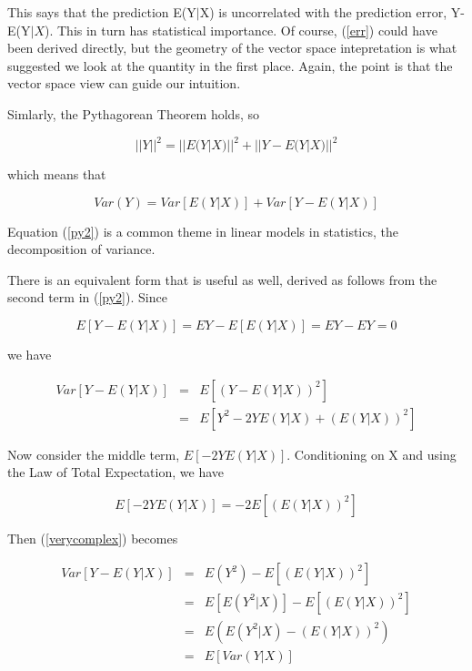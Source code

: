 This says that the prediction E(Y$|$X) is uncorrelated with the
prediction error, Y-E(Y$|X$).  This in turn has statistical importance.
Of course, (\ref{err}) could have been derived directly, but the
geometry of the vector space intepretation is what suggested we look at
the quantity in the first place.  Again, the point is that the vector
space view can guide our intuition.

Simlarly, the Pythagorean Theorem holds, so

\begin{equation}
\label{py}
{||Y||}^2 = {||E(Y|X)||}^2 + {||Y-E(Y|X)||}^2
\end{equation}

which means that

\begin{equation}
\label{py2}
Var(Y) = Var[E(Y|X)] + Var[Y-E(Y|X)]
\end{equation}

Equation (\ref{py2}) is a common theme in linear models in statistics,
the decomposition of variance.  

There is an equivalent form that is useful as well, derived as follows
from the second term in (\ref{py2}).  Since

\begin{equation}
E[Y-E(Y|X)] = EY - E[E(Y|X)] = EY - EY = 0
\end{equation}

we have

\begin{eqnarray}
\label{verycomplex}
Var[Y-E(Y|X)] &=& E \left [ (Y-E(Y|X))^2 \right ] \\ 
&=& E \left [ Y^2 -2YE(Y|X) + (E(Y|X))^2 \right ] 
\end{eqnarray}

Now consider the middle term, $E[-2YE(Y|X)]$.  Conditioning on X and
using the Law of Total Expectation, we have

\begin{equation}
E[-2YE(Y|X)] = -2 E \left [ (E(Y|X))^2 \right ]
\end{equation}

Then (\ref{verycomplex}) becomes

\begin{eqnarray}
Var[Y-E(Y|X)] &=& E (Y^2) - E \left [ (E(Y|X))^2 \right ] \\
&=& E \left [ E(Y^2 | X) \right ] - E \left [ (E(Y|X))^2 \right ] \\
&=& E \left ( E(Y^2 | X) - (E(Y|X))^2 \right ) \\
&=& E \left [ Var(Y|X) \right ]
\end{eqnarray}

